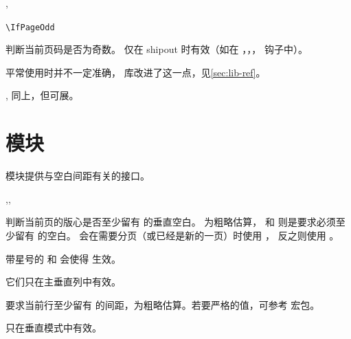 \documentclass{cusdoc}
\begin{document}
\begin{function}{\IfPageOdd,\IfAbsPageOdd}
  \begin{syntax}
    \verb|\IfPageOdd|  
  \end{syntax}
判断当前页码是否为奇数。 仅在 shipout 时有效（如在 ，，，
 钩子中）。

平常使用时并不一定准确， 库改进了这一点，见\cref{sec:lib-ref}。
\end{function}

\begin{function}[EXP]{\@ifpageodd,\@ifabspageodd}
同上，但可展。
\end{function}


\section{模块}

 模块提供与空白间距有关的接口。

\begin{function}{\needspace,\Needspace,\NeedspaceTF}
  \begin{syntax}
    \V\needspace   {}
    \V\Needspace   {}
    \V\Needspace * 
    \V\NeedspaceTF {}  
    \V\NeedspaceTF*{}  
  \end{syntax}
判断当前页的版心是否至少留有  的垂直空白。
 为粗略估算，
 和  则是要求必须至少留有  的空白。
 会在需要分页（或已经是新的一页）时使用 ，
反之则使用 。

带星号的  和  会使得  生效。

它们只在主垂直列中有效。
\end{function}

\begin{function}{\needhspace}
  \begin{syntax}
    \V\needhspace {}
  \end{syntax}
要求当前行至少留有  的间距，为粗略估算。若要严格的值，可参考  宏包。

只在垂直模式中有效。
\end{function}
\end{document}
